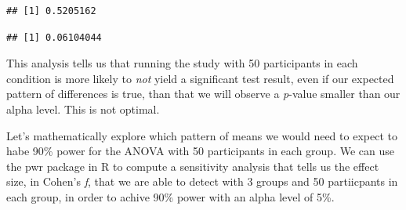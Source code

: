 \documentclass[]{book}
\newenvironment{Shaded}{\begin{snugshade}}{\end{snugshade}}
\newcommand{\CommentTok}[1]{\textcolor[rgb]{0.56,0.35,0.01}{\textit{#1}}}
\newcommand{\DataTypeTok}[1]{\textcolor[rgb]{0.13,0.29,0.53}{#1}}
\newcommand{\DecValTok}[1]{\textcolor[rgb]{0.00,0.00,0.81}{#1}}
\newcommand{\FloatTok}[1]{\textcolor[rgb]{0.00,0.00,0.81}{#1}}
\newcommand{\KeywordTok}[1]{\textcolor[rgb]{0.13,0.29,0.53}{\textbf{#1}}}
\newcommand{\NormalTok}[1]{#1}
\newcommand{\OperatorTok}[1]{\textcolor[rgb]{0.81,0.36,0.00}{\textbf{#1}}}
\newcommand{\StringTok}[1]{\textcolor[rgb]{0.31,0.60,0.02}{#1}}
\begin{document}
\begin{verbatim}
## [1] 0.5205162
\end{verbatim}

\begin{Shaded}
\end{Shaded}

\begin{verbatim}
## [1] 0.06104044
\end{verbatim}

This analysis tells us that running the study with 50 participants in each condition is more likely to \emph{not} yield a significant test result, even if our expected pattern of differences is true, than that we will observe a \emph{p}-value smaller than our alpha level. This is not optimal.

Let's mathematically explore which pattern of means we would need to expect to habe 90\% power for the ANOVA with 50 participants in each group. We can use the pwr package in R to compute a sensitivity analysis that tells us the effect size, in Cohen's \emph{f}, that we are able to detect with 3 groups and 50 partiicpants in each group, in order to achive 90\% power with an alpha level of 5\%.

\begin{Shaded}
\end{Shaded}
\end{document}
